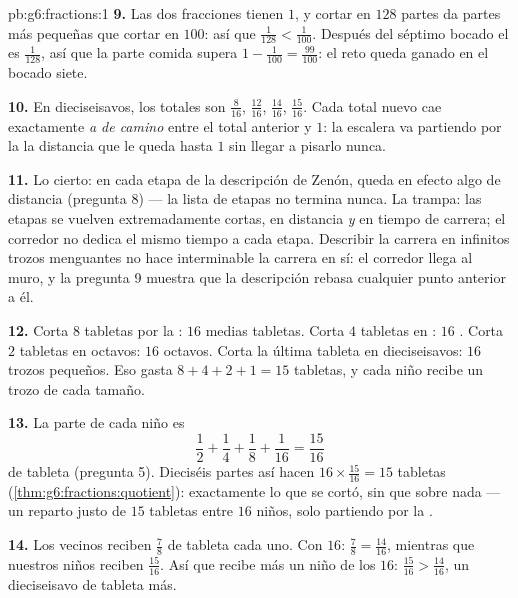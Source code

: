 \begin{solution}{pb:g6:fractions:1}
\textbf{9.} Las dos fracciones tienen  $1$, y cortar en
$128$ partes da partes más pequeñas que cortar en $100$: así que
$\frac{1}{128} < \frac{1}{100}$. Después del séptimo bocado el
 es $\frac{1}{128}$, así que la parte comida supera
$1 - \frac{1}{100} = \frac{99}{100}$: el reto queda ganado en el
bocado siete.

\textbf{10.} En dieciseisavos, los totales son $\frac{8}{16}$,
$\frac{12}{16}$, $\frac{14}{16}$, $\frac{15}{16}$. Cada total nuevo
cae exactamente \emph{a  de camino} entre el total anterior y $1$:
la escalera va partiendo por la  la distancia que le queda hasta $1$
sin llegar a pisarlo nunca.

\textbf{11.} Lo cierto: en cada etapa de la descripción de Zenón,
queda en efecto algo de distancia (pregunta 8) --- la lista de etapas
no termina nunca. La trampa: las etapas se vuelven extremadamente cortas, en
distancia \emph{y} en tiempo de carrera; el corredor no dedica
el mismo tiempo a cada etapa. Describir la carrera en infinitos
trozos menguantes no hace interminable la carrera en sí: el
corredor llega al muro, y la pregunta 9 muestra que la descripción
rebasa cualquier punto anterior a él.

\textbf{12.} Corta $8$ tabletas por la : $16$ medias tabletas. Corta $4$
tabletas en : $16$ . Corta $2$ tabletas en
octavos: $16$ octavos. Corta la última tableta en dieciseisavos:
$16$ trozos pequeños. Eso gasta $8 + 4 + 2 + 1 = 15$ tabletas, y cada
niño recibe un trozo de cada tamaño.

\textbf{13.} La parte de cada niño es
\[
\frac12 + \frac14 + \frac18 + \frac{1}{16} = \frac{15}{16}
\]
de tableta (pregunta 5). Dieciséis partes así hacen
$16 \times \frac{15}{16} = 15$ tabletas
(\cref{thm:g6:fractions:quotient}): exactamente lo que se cortó, sin
que sobre nada --- un reparto justo de $15$ tabletas entre $16$
niños, solo partiendo por la .

\textbf{14.} Los vecinos reciben $\frac78$ de tableta cada uno. Con
 $16$: $\frac78 = \frac{14}{16}$, mientras que nuestros niños
reciben $\frac{15}{16}$. Así que recibe más un niño de los $16$:
$\frac{15}{16} > \frac{14}{16}$, un dieciseisavo de tableta más.


\end{solution}
